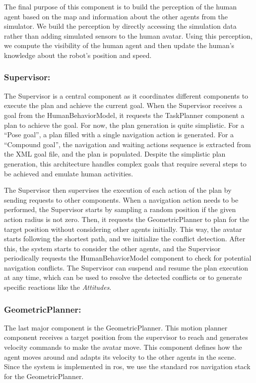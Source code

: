 The final purpose of this component is to build the perception of the human agent based on the map and information about the other agents from the simulator. We build the perception by directly accessing the simulation data rather than adding simulated sensors to the human avatar. Using this perception, we compute the visibility of the human agent and then update the human's knowledge about the robot's position and speed.

\subsubsection{Supervisor:}
The Supervisor is a central component as it coordinates different components to execute the plan and achieve the current goal. When the Supervisor receives a goal from the HumanBehaviorModel, it requests the TaskPlanner component a plan to achieve the goal. For now, the plan generation is quite simplistic. For a ``Pose goal'', a plan filled with a single navigation action is generated. For a ``Compound goal'', the navigation and waiting actions sequence is extracted from the XML goal file, and the plan is populated. Despite the simplistic plan generation, this architecture handles complex goals that require several steps to be achieved and emulate human activities.  

The Supervisor then supervises the execution of each action of the plan by sending requests to other components. 
When a navigation action needs to be performed, the Supervisor starts by sampling a random position if the given action radius is not zero. Then, it requests the GeometricPlanner to plan for the target position without considering other agents initially. This way, the avatar starts following the shortest path, and we initialize the conflict detection. After this, the system starts to consider the other agents, and the Supervisor periodically requests the HumanBehaviorModel component to check for potential navigation conflicts. The Supervisor can suspend and resume the plan execution at any time, which can be used to resolve the detected conflicts or to generate specific reactions like the \textit{Attitudes}.

\subsubsection{GeometricPlanner:}

The last major component is the GeometricPlanner. This motion planner component receives a target position from the supervisor to reach and generates velocity commands to make the avatar move. This component defines how the agent moves around and adapts its velocity to the other agents in the scene. Since the system is implemented in \acrshort{ros}, we use the standard \acrshort{ros} navigation stack for the GeometricPlanner.

